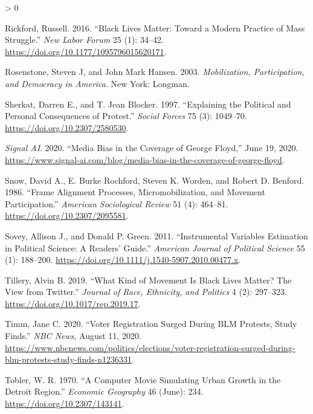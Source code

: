 \documentclass[
  12pt,
]{article}
\newlength{\cslhangindent}
\newenvironment{CSLReferences}[2] %
 {%
  \setlength{\parindent}{0pt}
  \ifodd #1 \everypar{\setlength{\hangindent}{\cslhangindent}}\ignorespaces\fi
  \ifnum #2 > 0
  \setlength{\parskip}{#2\baselineskip}
  \fi
 }%
 {}
\begin{document}
\begin{CSLReferences}{1}{0}
\leavevmode\hypertarget{ref-Rickford2016}{}%
Rickford, Russell. 2016. {``Black {Lives Matter}: {Toward} a {Modern Practice} of {Mass Struggle}.''} \emph{New Labor Forum} 25 (1): 34--42. \url{https://doi.org/10.1177/1095796015620171}.

\leavevmode\hypertarget{ref-Rosenstone2003}{}%
Rosenstone, Steven J, and John Mark Hansen. 2003. \emph{Mobilization, Participation, and Democracy in {America}}. {New York}: {Longman}.

\leavevmode\hypertarget{ref-Sherkat1997}{}%
Sherkat, Darren E., and T. Jean Blocker. 1997. {``Explaining the {Political} and {Personal Consequences} of {Protest}.''} \emph{Social Forces} 75 (3): 1049--70. \url{https://doi.org/10.2307/2580530}.

\leavevmode\hypertarget{ref-SignalAI2020}{}%
\emph{Signal AI}. 2020. {``Media Bias in the Coverage of {George Floyd},''} June 19, 2020. \url{https://www.signal-ai.com/blog/media-bias-in-the-coverage-of-george-floyd}.

\leavevmode\hypertarget{ref-Snow1986}{}%
Snow, David A., E. Burke Rochford, Steven K. Worden, and Robert D. Benford. 1986. {``Frame {Alignment Processes}, {Micromobilization}, and {Movement Participation}.''} \emph{American Sociological Review} 51 (4): 464--81. \url{https://doi.org/10.2307/2095581}.

\leavevmode\hypertarget{ref-Sovey2011}{}%
Sovey, Allison J., and Donald P. Green. 2011. {``Instrumental {Variables Estimation} in {Political Science}: {A Readers}' {Guide}.''} \emph{American Journal of Political Science} 55 (1): 188--200. \url{https://doi.org/10.1111/j.1540-5907.2010.00477.x}.

\leavevmode\hypertarget{ref-Tillery2019}{}%
Tillery, Alvin B. 2019. {``What {Kind} of {Movement} Is {Black Lives Matter}? {The View} from {Twitter}.''} \emph{Journal of Race, Ethnicity, and Politics} 4 (2): 297--323. \url{https://doi.org/10.1017/rep.2019.17}.

\leavevmode\hypertarget{ref-Timm2020}{}%
Timm, Jane C. 2020. {``Voter Registration Surged During {BLM} Protests, Study Finds.''} \emph{NBC News}, August 11, 2020. \url{https://www.nbcnews.com/politics/elections/voter-registration-surged-during-blm-protests-study-finds-n1236331}.

\leavevmode\hypertarget{ref-Tobler1970}{}%
Tobler, W. R. 1970. {``A {Computer Movie Simulating Urban Growth} in the {Detroit Region}.''} \emph{Economic Geography} 46 (June): 234. \url{https://doi.org/10.2307/143141}.


\end{CSLReferences}
\end{document}
